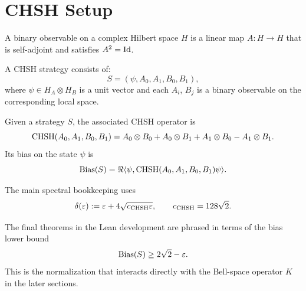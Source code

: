 \section{CHSH Setup}

\begin{definition}
\label{def:binary-observable}
A binary observable on a complex Hilbert space $H$ is a linear map $A : H \to H$ that is self-adjoint and satisfies $A^2 = \mathrm{Id}$.
\end{definition}

\begin{definition}
\label{def:chsh-strategy}
A CHSH strategy consists of:
\[
S = (\psi, A_0, A_1, B_0, B_1),
\]
where $\psi \in H_A \otimes H_B$ is a unit vector and each $A_i$, $B_j$ is a binary observable on the corresponding local space.
\end{definition}

\begin{definition}
\label{def:chsh-bias}
Given a strategy $S$, the associated CHSH operator is
\[
\mathrm{CHSH}(A_0,A_1,B_0,B_1)
= A_0 \otimes B_0 + A_0 \otimes B_1 + A_1 \otimes B_0 - A_1 \otimes B_1.
\]
Its bias on the state $\psi$ is
\[
\operatorname{Bias}(S) = \Re \langle \psi, \mathrm{CHSH}(A_0,A_1,B_0,B_1)\psi \rangle.
\]
\end{definition}

\begin{definition}
\label{def:delta}
The main spectral bookkeeping uses
\[
\delta(\varepsilon) := \varepsilon + 4\sqrt{c_{\mathrm{CHSH}} \varepsilon},
\qquad
c_{\mathrm{CHSH}} = 128 \sqrt{2}.
\]
\end{definition}

\begin{remark}
The final theorems in the Lean development are phrased in terms of the bias lower bound
\[
\operatorname{Bias}(S) \ge 2\sqrt{2} - \varepsilon.
\]
This is the normalization that interacts directly with the Bell-space operator $K$ in the later sections.
\end{remark}
